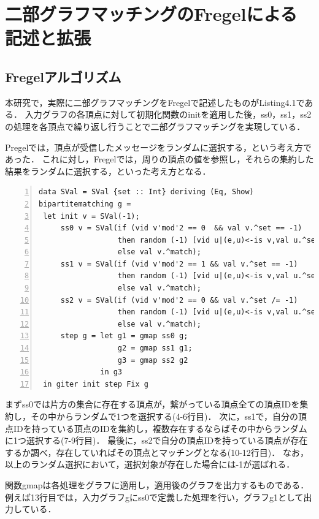 \documentclass[12pt]{ujreport}
\begin{document}
\newpage

\chapter{二部グラフマッチングのFregelによる記述と拡張}
\section{Fregelアルゴリズム}
本研究で，実際に二部グラフマッチングをFregelで記述したものがListing4.1である．
入力グラフの各頂点に対して初期化関数のinitを適用した後，ss0，ss1，ss2の処理を各頂点で繰り返し行うことで二部グラフマッチングを実現している．

Pregelでは，頂点が受信したメッセージをランダムに選択する，という考え方であった．
これに対し，Fregelでは，周りの頂点の値を参照し，それらの集約した結果をランダムに選択する，といった考え方となる．

\begin{lstlisting}[basicstyle=\ttfamily\scriptsize, frame = single,  numbers = left, tabsize = 3, captionpos = b, caption = {Fregelの二部グラフマッチング}]
data SVal = SVal {set :: Int} deriving (Eq, Show)
bipartitematching g =
 let init v = SVal(-1);
     ss0 v = SVal(if (vid v'mod'2 == 0  && val v.^set == -1)
                  then random (-1) [vid u|(e,u)<-is v,val u.^set == -1]
                  else val v.^match);
     ss1 v = SVal(if (vid v'mod'2 == 1 && val v.^set == -1)
                  then random (-1) [vid u|(e,u)<-is v,val u.^set == vid v]
                  else val v.^match);
     ss2 v = SVal(if (vid v'mod'2 == 0 && val v.^set /= -1)
                  then random (-1) [vid u|(e,u)<-is v,val u.^set == vid v]
                  else val v.^match);
     step g = let g1 = gmap ss0 g;
                  g2 = gmap ss1 g1;
                  g3 = gmap ss2 g2
              in g3
 in giter init step Fix g
\end{lstlisting}

まずss0では片方の集合に存在する頂点が，繋がっている頂点全ての頂点IDを集約し，その中からランダムで1つを選択する(4-6行目)．
次に，ss1で，自分の頂点IDを持っている頂点のIDを集約し，複数存在するならばその中からランダムに1つ選択する(7-9行目)．
最後に，ss2で自分の頂点IDを持っている頂点が存在するか調べ，存在していればその頂点とマッチングとなる(10-12行目)．
なお，以上のランダム選択において，選択対象が存在した場合には-1が選ばれる．

関数gmapは各処理をグラフに適用し，適用後のグラフを出力するものである．
例えば13行目では，入力グラフgにss0で定義した処理を行い，グラフg1として出力している．
\end{document}
